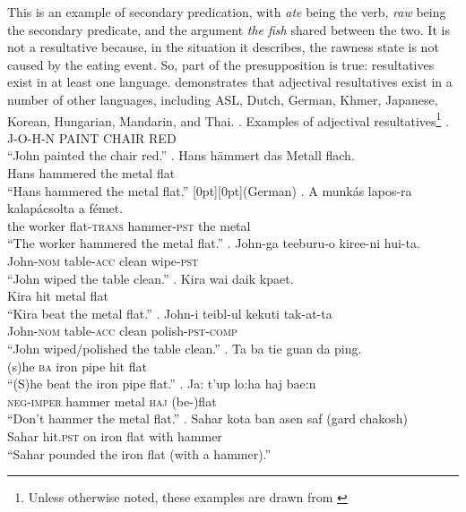 \documentclass[MilwayThesis]{subfiles}
\begin{document}
This is an example of secondary predication, with \textit{ate} being the verb, \textit{raw} being the secondary predicate, and the argument \textit{the fish} shared between the two.
It is not a resultative because, in the situation it describes, the rawness state is not caused by the eating event.
So, part of the presupposition is true: resultatives exist in at least one language.
\textcite{snyder1995language,snyder2001nature} demonstrates that adjectival resultatives exist in a number of other languages, including ASL, Dutch, German, Khmer, Japanese, Korean, Hungarian, Mandarin, and Thai.
\ex. Examples of adjectival resultatives\footnote{Unless otherwise noted, these examples are drawn from \textcite{snyder2001nature}}
\a. J-O-H-N PAINT CHAIR RED\hfill\parencite[ASL,][]{kentner2018wh}\\
``John painted the chair red.''
\bg. Hans h\"ammert das Metall flach.\\
Hans hammered the metal flat\\
``Hans hammered the metal flat.'' \hfill \raisebox{1.4\baselineskip}[0pt][0pt]{(German)}
\bg. A munk\'as lapos-ra kalap\'acsolta a f\'emet.\\
the worker flat-\textsc{trans} hammer-\textsc{pst} the metal\\
``The worker hammered the metal flat.'' 
\bg. John-ga teeburu-o kiree-ni hui-ta.\\
John-\textsc{nom} table-\textsc{acc} clean wipe-\textsc{pst}\\
``John wiped the table clean.''
\bg. Kira wai daik kpaet.\\
Kira hit metal flat\\
``Kira beat the metal flat.''
\bg. John-i teibl-ul kekuti tak-at-ta\\
John-\textsc{nom} table-\textsc{acc} clean polish-\textsc{pst}-\textsc{comp}\\
``John wiped/polished the table clean.''
\bg. Ta ba tie guan da ping.\\
(s)he \textsc{ba} iron pipe hit flat\\
``(S)he beat the iron pipe flat.''
\bg. Ja: t'up lo:ha\textglotstop{} haj bae:n\\
\textsc{neg-imper} hammer metal \textsc{haj} (be-)flat\\
``Don't hammer the metal flat.''
\bg. Sahar kota ban asen saf (gard chakosh)\\
Sahar hit.\textsc{pst} on iron flat with hammer\\
``Sahar pounded the iron flat (with a hammer).''
\end{document}
